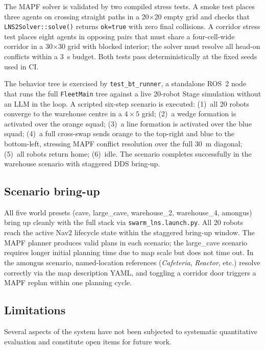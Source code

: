 \documentclass[conference]{IEEEtran}
\begin{document}
The MAPF solver is validated by two compiled stress tests.
A smoke test places three agents on crossing straight paths
in a 20$\times$20 empty grid and checks that
\texttt{LNS2Solver::solve()} returns \texttt{ok=true} with
zero final collisions. A corridor stress test places eight
agents in opposing pairs that must share a four-cell-wide
corridor in a 30$\times$30 grid with blocked interior; the
solver must resolve all head-on conflicts within a 3~s
budget. Both tests pass deterministically at the fixed seeds
used in CI.

The behavior tree is exercised by \texttt{test\_bt\_runner},
a standalone ROS~2 node that runs the full
\texttt{FleetMain} tree against a live 20-robot Stage
simulation without an LLM in the loop. A scripted six-step
scenario is executed: (1)~all 20 robots converge to the
warehouse centre in a $4{\times}5$ grid; (2)~a wedge
formation is activated over the orange squad; (3)~a line
formation is activated over the blue squad; (4)~a full
cross-swap sends orange to the top-right and blue to the
bottom-left, stressing MAPF conflict resolution over the
full 30~m diagonal; (5)~all robots return home; (6)~idle.
The scenario completes successfully in the warehouse
scenario with staggered DDS bring-up.

\subsection{Scenario bring-up}

All five world presets (\textsf{cave}, \textsf{large\_cave},
\textsf{warehouse\_2}, \textsf{warehouse\_4},
\textsf{amongus}) bring up cleanly with the full stack via
\texttt{swarm\_lns.launch.py}. All 20 robots reach the
\textsf{active} Nav2 lifecycle state within the staggered
bring-up window. The MAPF planner produces valid plans in
each scenario; the \textsf{large\_cave} scenario requires
longer initial planning time due to map scale but does not
time out. In the \textsf{amongus} scenario, named-location
references (\emph{Cafeteria}, \emph{Reactor}, etc.) resolve
correctly via the map description YAML, and toggling a
corridor door triggers a MAPF replan within one planning
cycle.

\subsection{Limitations}

Several aspects of the system have not been subjected to
systematic quantitative evaluation and constitute open items
for future work.
\end{document}

